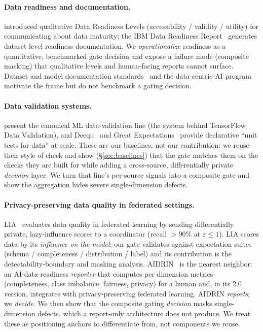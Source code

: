 \documentclass[11pt]{article}
\begin{document}
\paragraph{Data readiness and documentation.}
\citet{lawrence2017datareadiness} introduced qualitative Data Readiness Levels
(accessibility / validity / utility) for communicating about data maturity; the
IBM Data Readiness Report~\citep{afzal2020datareadinessreport} generates
dataset-level readiness documentation. We \emph{operationalize} readiness as a
quantitative, benchmarked gate decision and expose a failure mode (composite
masking) that qualitative levels and human-facing reports cannot surface. Dataset
and model documentation standards~\citep{gebru2021datasheets,mitchell2019modelcards,bender2018datastatements}
and the data-centric-AI program~\citep{zha2023datacentric} motivate the frame but
do not benchmark a gating decision.

\paragraph{Data validation systems.}
\citet{breck2019datavalidation} present the canonical ML data-validation line (the
system behind TensorFlow Data Validation), and Deequ~\citep{schelter2018deequ} and
Great Expectations~\citep{greatexpectations} provide declarative ``unit tests for
data'' at scale. These are our baselines, not our contribution: we reuse their
style of check and show (\S\ref{sec:baselines}) that the gate matches them on the
checks they are built for while adding a cross-source, differentially private
\emph{decision} layer. We turn that line's per-source signals into a composite gate
and show the aggregation hides severe single-dimension defects.

\paragraph{Privacy-preserving data quality in federated settings.}
LIA~\citep{rokvic2022lia} evaluates data quality in federated learning by sending
differentially private, lazy-influence scores to a coordinator (recall $>$90\% at
$\varepsilon\leq1$). LIA scores data by its \emph{influence on the model}; our gate
validates against expectation suites (schema / completeness / distribution /
label) and its contribution is the detectability-boundary and masking analysis.
AIDRIN~\citep{hiniduma2025aidrin} is the nearest neighbor: an AI-data-readiness
\emph{reporter} that computes per-dimension metrics (completeness, class imbalance,
fairness, privacy) for a human and, in its 2.0 version, integrates with
privacy-preserving federated learning. AIDRIN \emph{reports}; we \emph{decide}. We
then show that the composite gating \emph{decision} masks single-dimension defects,
which a report-only architecture does not produce. We treat these as positioning
anchors to differentiate from, not components we reuse.
\end{document}
